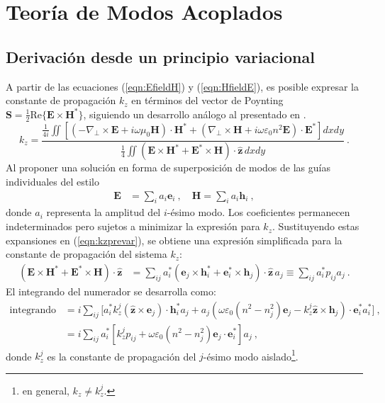 \section{Teoría de Modos Acoplados \label{cap:CMTteo}}
\subsection{Derivación desde un principio variacional}

A partir de las ecuaciones (\ref{eqn:EfieldH}) y (\ref{eqn:HfieldE}), es posible expresar la constante de propagación $k_z$ en términos del vector de Poynting $\textbf{S} = \frac{1}{2} \text{Re}\{\textbf{E} \times \textbf{H}^*\}$, siguiendo un desarrollo análogo al presentado en \citep{haus_coupled-mode}. 
\begin{equation}
	k_z = \frac{
		\frac{1}{4i} \iint \left[
		\left(-\nabla_\perp \times \textbf{E} + i\omega \mu_0 \textbf{H}\right) \cdot \textbf{H}^* 
		+ \left(\nabla_\perp \times \textbf{H} + i\omega \varepsilon_0 n^2 \textbf{E}\right) \cdot \textbf{E}^*
		\right] dxdy
	}{
		\frac{1}{4} \iint \left( 
		\textbf{E} \times \textbf{H}^* + \textbf{E}^* \times \textbf{H}
		\right) \cdot \hat{\textbf{z}} \, dxdy
	} \ . 
	\label{eqn:kzprevar}
\end{equation}
Al proponer una solución en forma de superposición de modos de las guías individuales del estilo
\begin{align*}
	\textbf{E} &= \sum_i a_i \textbf{e}_i \ , \quad \textbf{H} = \sum_i a_i \textbf{h}_i \ ,
\end{align*}
donde $a_i$ representa la amplitud del $i$-ésimo modo. Los coeficientes permanecen indeterminados pero sujetos a minimizar la expresión para $k_z$. Sustituyendo estas expansiones en (\ref{eqn:kzprevar}), se obtiene una expresión simplificada para la constante de propagación del sistema $k_z$:
\begin{align*}
	(\textbf{E}\times\textbf{H}^* + \textbf{E}^*\times\textbf{H})\cdot\hat{\textbf{z}} 
	&= \sum_{ij} a_i^* \left( \textbf{e}_j \times \textbf{h}_i^* + \textbf{e}_i^* \times \textbf{h}_j \right) \cdot \hat{\textbf{z}} \, a_j 
	\equiv \sum_{ij} a_i^* p_{ij} a_j \ .
\end{align*}
El integrando del numerador se desarrolla como:
\begin{align*}
	\text{integrando numerador} &= i\sum_{ij} \Big[ a_i^* k_z^j (\hat{\textbf{z}}\times\textbf{e}_j )\cdot\textbf{h}_i^* a_j  + a_j \left(\omega \varepsilon_0 (n^2-n_j^2) \textbf{e}_j - k_z^j \hat{\textbf{z}}\times\textbf{h}_j \right) \cdot \textbf{e}_i^* a_i^* \Big] \ , \\
	&= i\sum_{ij} a_i^* \left[ k_z^j p_{ij} + \omega \varepsilon_0(n^2-n_j^2) \textbf{e}_j \cdot \textbf{e}_i^* \right] a_j \ ,
\end{align*}
donde $k_z^j$ es la constante de propagación del $j$-ésimo modo aislado\footnote{en general, $k_z \neq k_z^j$.}. 

